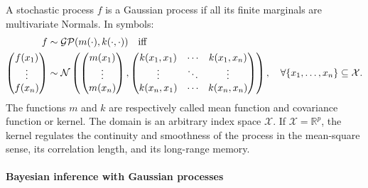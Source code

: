 \documentclass[a4paper]{article}
\theoremstyle{definition}
\begin{document}
    A stochastic process $f$ is a Gaussian process if all its finite marginals are multivariate Normals. In symbols:
    \begin{align}
        f &\sim \mathcal G \mathcal P(m(\cdot), k(\cdot, \cdot))
        \quad\text{iff} \notag \\
        \begin{pmatrix}
            f(x_1) \\ \vdots \\ f(x_n)
        \end{pmatrix} &\sim \mathcal N \left( \begin{pmatrix}
            m(x_1) \\ \vdots \\ m(x_n)
        \end{pmatrix}, \begin{pmatrix}
            k(x_1, x_1) & \cdots & k(x_1, x_n) \\
            \vdots & \ddots & \vdots \\
            k(x_n, x_1) & \cdots & k(x_n, x_n)
        \end{pmatrix}
        \right), \quad \forall \{x_1, \ldots, x_n\} \subseteq \mathcal X.
    \end{align}
    The functions $m$ and $k$ are respectively called mean function and covariance function or kernel. The domain is an arbitrary index space $\mathcal X$. If $\mathcal X = \mathbb R^p$, the kernel regulates the continuity and smoothness of the process in the mean-square sense, its correlation length, and its long-range memory.

    \paragraph{Bayesian inference with Gaussian processes}
    
\end{document}
